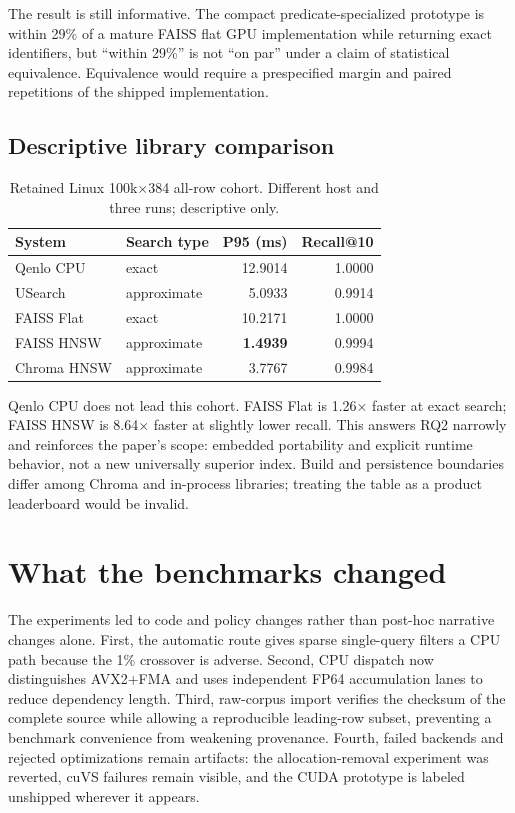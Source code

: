 \documentclass{article}
\begin{document}
The result is still informative. The compact predicate-specialized prototype is within 29\% of a
mature FAISS flat GPU implementation while returning exact identifiers, but ``within 29\%'' is not
``on par'' under a claim of statistical equivalence. Equivalence would require a prespecified
margin and paired repetitions of the shipped implementation.

\subsection{Descriptive library comparison}

\begin{table}[t]
\caption{Retained Linux 100k$\times$384 all-row cohort. Different host and three runs; descriptive only.}
\label{tab:linux}
\centering
\small
\begin{tabular}{llrr}
\toprule
System & Search type & P95 (ms) & Recall@10 \\
\midrule
Qenlo CPU & exact & 12.9014 & 1.0000 \\
USearch & approximate & 5.0933 & 0.9914 \\
FAISS Flat & exact & 10.2171 & 1.0000 \\
FAISS HNSW & approximate & \textbf{1.4939} & 0.9994 \\
Chroma HNSW & approximate & 3.7767 & 0.9984 \\
\bottomrule
\end{tabular}
\end{table}

Qenlo CPU does not lead this cohort. FAISS Flat is 1.26$\times$ faster at exact search; FAISS HNSW
is 8.64$\times$ faster at slightly lower recall. This answers RQ2 narrowly and reinforces the
paper's scope: embedded portability and explicit runtime behavior, not a new universally superior
index. Build and persistence boundaries differ among Chroma and in-process libraries; treating the
table as a product leaderboard would be invalid.

\section{What the benchmarks changed}

The experiments led to code and policy changes rather than post-hoc narrative changes alone.
First, the automatic route gives sparse single-query filters a CPU path because the 1\% crossover
is adverse. Second, CPU dispatch now distinguishes AVX2+FMA and uses independent FP64 accumulation
lanes to reduce dependency length. Third, raw-corpus import verifies the checksum of the complete
source while allowing a reproducible leading-row subset, preventing a benchmark convenience from
weakening provenance. Fourth, failed backends and rejected optimizations remain artifacts: the
allocation-removal experiment was reverted, cuVS failures remain visible, and the CUDA prototype is
labeled unshipped wherever it appears.
\end{document}
